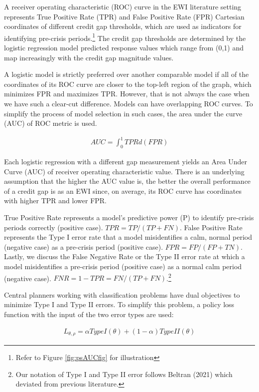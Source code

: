 \documentclass[
  12pt,
]{article}
\begin{document}
A receiver operating characteristic (ROC) curve in the EWI literature setting represents True Positive Rate (TPR) and False Positive Rate (FPR) Cartesian coordinates of different credit gap thresholds, which are used as indicators for identifying pre-crisis periods.\footnote{Refer to Figure \ref{fig:psAUCfig} for illustration} The credit gap thresholds are determined by the logistic regression model predicted response values which range from (0,1) and map increasingly with the credit gap magnitude values.

A logistic model is strictly preferred over another comparable model if all of the coordinates of its ROC curve are closer to the top-left region of the graph, which minimizes FPR and maximizes TPR. However, that is not always the case when we have such a clear-cut difference. Models can have overlapping ROC curves. To simplify the process of model selection in such cases, the area under the curve (AUC) of ROC metric is used.

\begin{align*}
AUC = \int_0^1 TPR d(FPR)
\end{align*}

Each logistic regression with a different gap measurement yields an Area Under Curve (AUC) of receiver operating characteristic value. There is an underlying assumption that the higher the AUC value is, the better the overall performance of a credit gap is as an EWI since, on average, its ROC curve has coordinates with higher TPR and lower FPR.

True Positive Rate represents a model's predictive power (P) to identify pre-crisis periods correctly (positive case). \(TPR = TP / (TP + FN)\). False Positive Rate represents the Type I error rate that a model misidentifies a calm, normal period (negative case) as a pre-crisis period (positive case). \(FPR = FP / (FP + TN)\). Lastly, we discuss the False Negative Rate or the Type II error rate at which a model misidentifies a pre-crisis period (positive case) as a normal calm period (negative case). \(FNR = 1 - TPR = FN / (TP + FN)\).\footnote{Our notation of Type I and Type II error follows Beltran (2021) which deviated from previous literature.}

Central planners working with classification problems have dual objectives to minimize Type I and Type II errors. To simplify this problem, a policy loss function with the input of the two error types are used:

\begin{align} \label{eq:policylossold}
L_{\theta,\rho}=\alpha TypeI(\theta)+(1-\alpha)TypeII(\theta)
\end{align}
\end{document}
